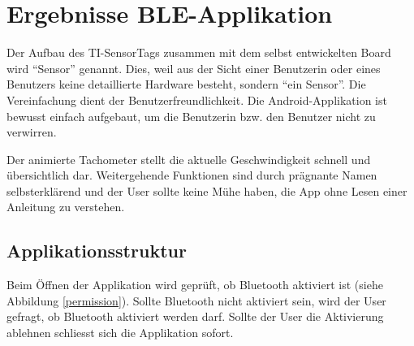 %
%


\section{Ergebnisse BLE-Applikation}

Der Aufbau des TI-SensorTags zusammen mit dem selbst entwickelten Board wird ``Sensor'' genannt. Dies, weil aus der Sicht einer Benutzerin oder eines Benutzers keine detaillierte Hardware besteht, sondern ``ein Sensor''. Die Vereinfachung dient der Benutzerfreundlichkeit. Die Android-Applikation ist bewusst einfach aufgebaut, um die Benutzerin bzw. den Benutzer nicht zu verwirren. 

Der animierte Tachometer stellt die aktuelle Geschwindigkeit schnell und übersichtlich dar. Weitergehende Funktionen sind durch prägnante Namen selbsterklärend und der User sollte keine Mühe haben, die App ohne Lesen einer Anleitung zu verstehen.

\subsection{Applikationsstruktur}

Beim Öffnen der Applikation wird geprüft, ob Bluetooth aktiviert ist (siehe Abbildung \ref{permission}). Sollte Bluetooth nicht aktiviert sein, wird der User gefragt, ob Bluetooth aktiviert werden darf. Sollte der User die Aktivierung ablehnen schliesst sich die Applikation sofort.

